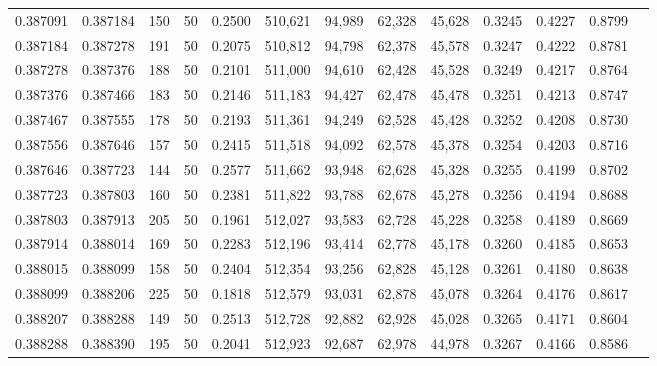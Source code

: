 \begin{tabular}{rrrrrrrrrrrrr}
0.387091 & 0.387184 &   150 &  50 &                                     0.2500 & 510,621 &  94,989 &  62,328 &  45,628 & 0.3245 & 0.4227 & 0.8799 \\
0.387184 & 0.387278 &   191 &  50 &                                     0.2075 & 510,812 &  94,798 &  62,378 &  45,578 & 0.3247 & 0.4222 & 0.8781 \\
0.387278 & 0.387376 &   188 &  50 &                                     0.2101 & 511,000 &  94,610 &  62,428 &  45,528 & 0.3249 & 0.4217 & 0.8764 \\
0.387376 & 0.387466 &   183 &  50 &                                     0.2146 & 511,183 &  94,427 &  62,478 &  45,478 & 0.3251 & 0.4213 & 0.8747 \\
0.387467 & 0.387555 &   178 &  50 &                                     0.2193 & 511,361 &  94,249 &  62,528 &  45,428 & 0.3252 & 0.4208 & 0.8730 \\
0.387556 & 0.387646 &   157 &  50 &                                     0.2415 & 511,518 &  94,092 &  62,578 &  45,378 & 0.3254 & 0.4203 & 0.8716 \\
0.387646 & 0.387723 &   144 &  50 &                                     0.2577 & 511,662 &  93,948 &  62,628 &  45,328 & 0.3255 & 0.4199 & 0.8702 \\
0.387723 & 0.387803 &   160 &  50 &                                     0.2381 & 511,822 &  93,788 &  62,678 &  45,278 & 0.3256 & 0.4194 & 0.8688 \\
0.387803 & 0.387913 &   205 &  50 &                                     0.1961 & 512,027 &  93,583 &  62,728 &  45,228 & 0.3258 & 0.4189 & 0.8669 \\
0.387914 & 0.388014 &   169 &  50 &                                     0.2283 & 512,196 &  93,414 &  62,778 &  45,178 & 0.3260 & 0.4185 & 0.8653 \\
0.388015 & 0.388099 &   158 &  50 &                                     0.2404 & 512,354 &  93,256 &  62,828 &  45,128 & 0.3261 & 0.4180 & 0.8638 \\
0.388099 & 0.388206 &   225 &  50 &                                     0.1818 & 512,579 &  93,031 &  62,878 &  45,078 & 0.3264 & 0.4176 & 0.8617 \\
0.388207 & 0.388288 &   149 &  50 &                                     0.2513 & 512,728 &  92,882 &  62,928 &  45,028 & 0.3265 & 0.4171 & 0.8604 \\
0.388288 & 0.388390 &   195 &  50 &                                     0.2041 & 512,923 &  92,687 &  62,978 &  44,978 & 0.3267 & 0.4166 & 0.8586 \\

\end{tabular}
